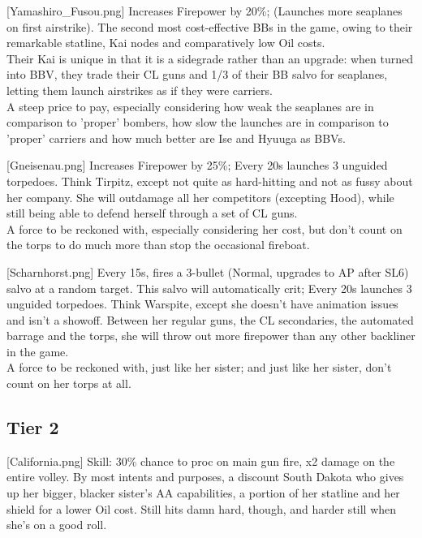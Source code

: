 [Yamashiro_Fusou.png]
{Increases Firepower by 20\%; (Launches more seaplanes on first airstrike).}
{}
{The second most cost-effective BBs in the game, owing to their remarkable statline, Kai nodes and comparatively low Oil costs.\\
Their Kai is unique in that it is a sidegrade rather than an upgrade: when turned into BBV, they trade their CL guns and 1/3 of their BB salvo for seaplanes, letting them launch airstrikes as if they were carriers.\\
A steep price to pay, especially considering how weak the seaplanes are in comparison to 'proper' bombers, how slow the launches are in comparison to 'proper' carriers and how much better are Ise and Hyuuga as BBVs.}
 
[Gneisenau.png]
{Increases Firepower by 25\%; Every 20s launches 3 unguided torpedoes.}
{}
{Think Tirpitz, except not quite as hard-hitting and not as fussy about her company. She will outdamage all her competitors (excepting Hood), while still being able to defend herself through a set of CL guns.\\
A force to be reckoned with, especially considering her cost, but don't count on the torps to do much more than stop the occasional fireboat.}
 
[Scharnhorst.png]
{Every 15s, fires a 3-bullet (Normal, upgrades to AP after SL6) salvo at a random target. This salvo will automatically crit; Every 20s launches 3 unguided torpedoes.}
{}
{Think Warspite, except she doesn't have animation issues and isn't a showoff. Between her regular guns, the CL secondaries, the automated barrage and the torps, she will throw out more firepower than any other backliner in the game.\\
A force to be reckoned with, just like her sister; and just like her sister, don't count on her torps at all.}
 
 
\newpage
\subsection{Tier 2}
[California.png]
{Skill: 30\% chance to proc on main gun fire, x2 damage on the entire volley.}
{}
{By most intents and purposes, a discount South Dakota who gives up her bigger, blacker sister's AA capabilities, a portion of her statline and her shield for a lower Oil cost. Still hits damn hard, though, and harder still when she's on a good roll.}

